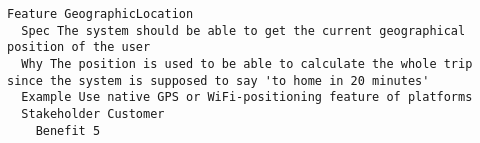 

\begin{lstlisting}
Feature GeographicLocation
  Spec The system should be able to get the current geographical position of the user
  Why The position is used to be able to calculate the whole trip since the system is supposed to say 'to home in 20 minutes' 
  Example Use native GPS or WiFi-positioning feature of platforms
  Stakeholder Customer
    Benefit 5

\end{lstlisting}